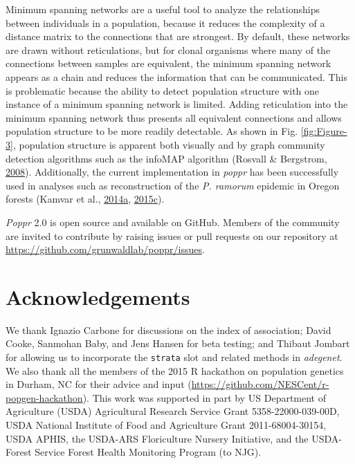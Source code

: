 \documentclass[double,11pt]{beavtex}
\begin{document}
  Minimum spanning networks are a useful tool to analyze the relationships
  between individuals in a population, because it reduces the complexity
  of a distance matrix to the connections that are strongest. By default,
  these networks are drawn without reticulations, but for clonal organisms
  where many of the connections between samples are equivalent, the
  minimum spanning network appears as a chain and reduces the information
  that can be communicated. This is problematic because the ability to
  detect population structure with one instance of a minimum spanning
  network is limited. Adding reticulation into the minimum spanning
  network thus presents all equivalent connections and allows population
  structure to be more readily detectable. As shown in Fig.
  \ref{fig:Figure-3}, population structure is apparent both visually and
  by graph community detection algorithms such as the infoMAP algorithm
  (Rosvall \& Bergstrom, \protect\hyperlink{ref-rosvall2008maps}{2008}).
  Additionally, the current implementation in \emph{poppr} has been
  successfully used in analyses such as reconstruction of the \emph{P.
  ramorum} epidemic in Oregon forests (Kamvar et al.,
  \protect\hyperlink{ref-kamvar2014sudden}{2014}\protect\hyperlink{ref-kamvar2014sudden}{a},
  \protect\hyperlink{ref-kamvar2015spatial}{2015}\protect\hyperlink{ref-kamvar2015spatial}{c}).
  
  \emph{Poppr} 2.0 is open source and available on GitHub. Members of the
  community are invited to contribute by raising issues or pull requests
  on our repository at \url{https://github.com/grunwaldlab/poppr/issues}.
  
  \newpage
  
  \section{Acknowledgements}\label{acknowledgements-1}
  
  We thank Ignazio Carbone for discussions on the index of association;
  David Cooke, Sanmohan Baby, and Jens Hansen for beta testing; and
  Thibaut Jombart for allowing us to incorporate the \texttt{strata} slot
  and related methods in \emph{adegenet}. We also thank all the members of
  the 2015 R hackathon on population genetics in Durham, NC for their
  advice and input (\url{https://github.com/NESCent/r-popgen-hackathon}).
  This work was supported in part by US Department of Agriculture (USDA)
  Agricultural Research Service Grant 5358-22000-039-00D, USDA National
  Institute of Food and Agriculture Grant 2011-68004-30154, USDA APHIS,
  the USDA-ARS Floriculture Nursery Initiative, and the USDA-Forest
  Service Forest Health Monitoring Program (to NJG).
  
\end{document}

